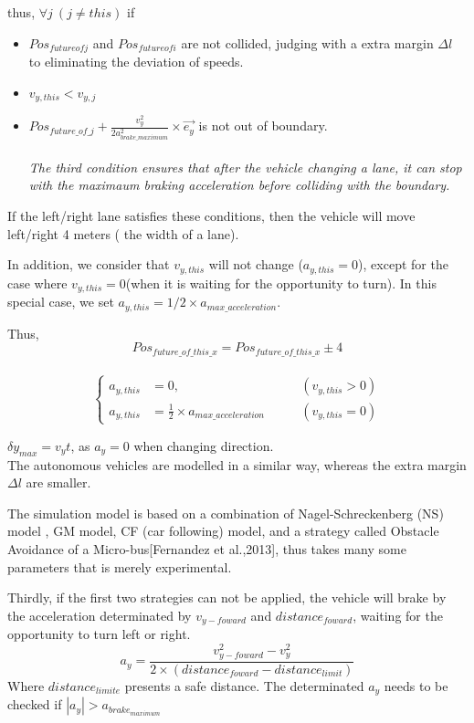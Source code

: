 \documentclass{mcmthesis}
\begin{document}
thus, $\forall j\ (j \neq this) $ if
\begin{itemize}
		\item $Pos_{future of j}$ and $ Pos_{future of i}$ are not collided, judging with a extra margin $\Delta l$ to eliminating the deviation of speeds.
		\item $v_{y,this} < v_{y,j} $
		\item $Pos_{future \_ of \_ j} + \frac{v_y^2}{2a_{brake \_ maximum}^2} \times \overrightarrow{e_y}$ is not out of boundary.
		\\ \\ \emph{The third condition ensures that after the vehicle changing a lane, it can stop with the maximaum braking acceleration before colliding with the boundary. }
\end{itemize}

If the left/right lane satisfies these conditions, then the vehicle will move left/right 4 meters ( the width of a lane).


In addition, we consider that $v_{y,this}$ will not change ($a_{y,this} = 0$), except for the case where $v_{y,this} = 0$(when it is waiting for the opportunity to turn). In this special case, we set $a_{y,this} = 1/2 \times a_{max \_ acceleration}$.

Thus, \\
$$Pos_{future\_of\_this\_x} = Pos_{future\_of\_this\_x} \pm 4$$\\
$$\left\{ 
\begin{aligned}
a_{y,this} &= 0 ,   \qquad& (v_{y,this} > 0)\\
a_{y,this} &= \frac{1}{2}\times a_{max \_ acceleration} \qquad &(v_{y,this} = 0)
\end{aligned}
\right.
$$

 $\delta y_{max}=v_yt$, as $a_y=0$ when changing direction.\\


The autonomous vehicles are modelled in a similar way, whereas the extra margin $\Delta l$ are smaller. 

The simulation model is based on a combination of Nagel-Schreckenberg (NS) model \cite{acelluar}, GM model, CF (car following) model, and a strategy called Obstacle Avoidance of a Micro-bus[Fernandez et al.,2013], thus takes many some parameters that is merely experimental.

Thirdly, if the first two strategies can not be applied, the vehicle will brake by the acceleration determinated by $v_{y-{foward}}$ and $distance_{foward}$, waiting for the opportunity to turn left or right.
$$
	a_y = \frac{v_{y-foward}^2 - v_y^2}{2\times(distance_{foward} - distance_{limit})}
$$
	Where $distance_{limite}$ presents a safe distance.
	The determinated $a_y$ needs to be checked if  $|a_y| > a_{brake_{maximum}} $ 
\end{document}
